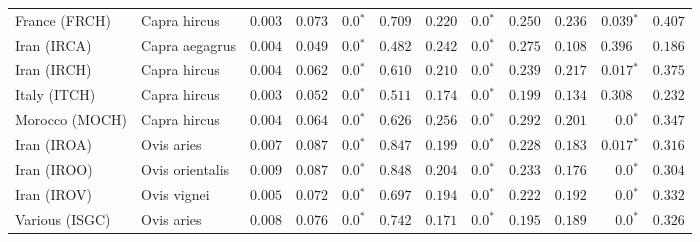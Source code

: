 \documentclass[11pt]{article}
\begin{document}
\begin{table*}[tb]
\begin{tabular}{||l|l|r||r|r|r||r|r|r||r|r|r||}
            \rowcolor{LIGHTGREY} France (FRCH)                  & Capra hircus        & $ 0.003$ & $ 0.073$ & $\bm{0.0{^*}}$                  & $ 0.709$                                                                     & $ 0.220$                      & $\bm{0.0{^*}}$ & $ 0.250$ & $ 0.236$ & $\bm{ 0.039{^*}}$ & $ 0.407$ \\
            \rowcolor{LIGHTGREY} Iran (IRCA)                    & Capra aegagrus      & $ 0.004$ & $ 0.049$ & $\bm{0.0{^*}}$                  & $ 0.482$                                                                     & $ 0.242$                      & $\bm{0.0{^*}}$ & $ 0.275$ & $ 0.108$ & $ 0.396~~$ & $ 0.186$ \\
            \rowcolor{LIGHTGREY} Iran (IRCH)                    & Capra hircus        & $ 0.004$ & $ 0.062$ & $\bm{0.0{^*}}$    & $ 0.610$                                                                     & $ 0.210$                      & $\bm{0.0{^*}}$ & $ 0.239$ & $ 0.217$ & $\bm{ 0.017{^*}}$ & $ 0.375$ \\
            \rowcolor{LIGHTGREY} Italy (ITCH)                   & Capra hircus        & $ 0.003$ & $ 0.052$ & $\bm{0.0{^*}}$    & $ 0.511$                                                                     & $ 0.174$                      & $\bm{0.0{^*}}$ & $ 0.199$ & $ 0.134$ & $ 0.308~~$ & $ 0.232$ \\
            \rowcolor{LIGHTGREY} Morocco (MOCH)                 & Capra hircus        & $ 0.004$ & $ 0.064$ & $\bm{0.0{^*}}$                  & $ 0.626$                                                                     & $ 0.256$                      & $\bm{0.0{^*}}$ & $ 0.292$ & $ 0.201$ & $\bm{0.0{^*}}$ & $ 0.347$ \\
            Iran (IROA)                                         & Ovis aries          & $ 0.007$ & $ 0.087$ & $\bm{0.0{^*}}$    & $ 0.847$ & $ 0.199$ & $\bm{0.0{^*}}$ & $ 0.228$ & $ 0.183$ & $\bm{ 0.017{^*}}$ & $ 0.316$ \\
            Iran (IROO)                                         & Ovis orientalis     & $ 0.009$ & $ 0.087$ & $\bm{0.0{^*}}$    & $ 0.848$ & $ 0.204$ & $\bm{0.0{^*}}$ & $ 0.233$ & $ 0.176$ & $\bm{0.0{^*}}$ & $ 0.304$ \\
            Iran (IROV)                                         & Ovis vignei         & $ 0.005$ & $ 0.072$ & $\bm{0.0{^*}}$    & $ 0.697$ & $ 0.194$ & $\bm{0.0{^*}}$ & $ 0.222$ & $ 0.192$ & $\bm{0.0{^*}}$ & $ 0.332$ \\
            Various (ISGC)                                      & Ovis aries          & $ 0.008$ & $ 0.076$ & $\bm{0.0{^*}}$    & $ 0.742$ & $ 0.171$ & $\bm{0.0{^*}}$ & $ 0.195$ & $ 0.189$ & $\bm{0.0{^*}}$ & $ 0.326$ \\

\end{tabular}
\end{table*}
\end{document}
